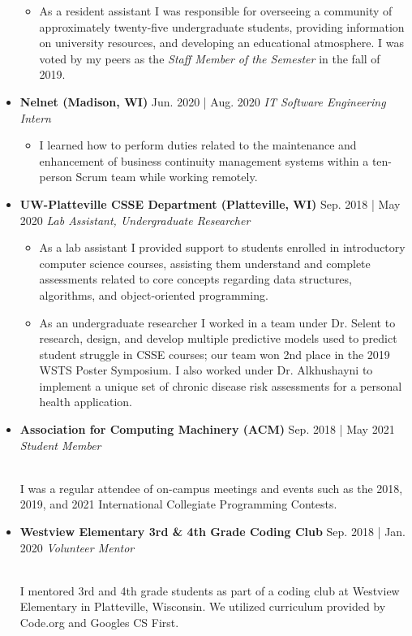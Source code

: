 \documentclass[11pt]{article}
\newlength{\outerbordwidth}
\newcommand{\resheading}[1]{
  \parbox{\textwidth}{\setlength{\FrameSep}{\outerbordwidth}
    \begin{shaded}
\setlength{\fboxsep}{0pt}\framebox[\textwidth][l]{\setlength{\fboxsep}{4pt}\fcolorbox{shadecolorB}{shadecolorB}{\textbf{\sffamily{\mbox{~}\makebox[6.762in][l]{\large #1} \vphantom{p\^{E}}}}}}
    \end{shaded}
  }\vspace{-11pt}
}
\newcommand{\job}[3]{\vspace{1.5mm}
  \textbf{#1} \hfill #2 \linebreak \textit{#3}
}
\newcommand{\organization}[3]{\vspace{1.5mm}
  \textbf{#1} \hfill #2 \linebreak \textit{#3}
}
\begin{document}
\begin{itemize}[leftmargin=*]
\begin{itemize}
	      	\item As a resident assistant I was responsible for overseeing a community of approximately twenty-five undergraduate students, providing information on university resources, and developing an educational atmosphere. I was voted by my peers as the \emph{Staff Member of the Semester} in the fall of 2019.
	      \end{itemize}
	\item[]
	      \job
	      {Nelnet (Madison, WI)}
	      {Jun. 2020 | Aug. 2020}
	      {IT Software Engineering Intern}
	      \begin{itemize}
	      	\item I learned how to perform duties related to the maintenance and enhancement of business continuity management systems within a ten-person Scrum team while working remotely.
	      \end{itemize}
	\item[]
	      \job
	      {UW-Platteville CSSE Department (Platteville, WI)}
	      {Sep. 2018 | May 2020}
	      {Lab Assistant, Undergraduate Researcher}
	      \begin{itemize}
		\item As a lab assistant I provided support to students enrolled in introductory computer science courses, assisting them understand and complete assessments related to core concepts regarding data structures, algorithms, and object-oriented programming.
	      	\item As an undergraduate researcher I worked in a team under Dr. Selent to research, design, and develop multiple predictive models used to predict student struggle in CSSE courses; our team won 2nd place in the 2019 WSTS Poster Symposium. I also worked under Dr. Alkhushayni to implement a unique set of chronic disease risk assessments for a personal health application.
	      \end{itemize}
\end{itemize}
\resheading{Organizations}
\begin{itemize}[leftmargin=*]
	\item[]
	      \organization
	      {Association for Computing Machinery (ACM)}
	      {Sep. 2018 | May 2021}
	      {Student Member}
	      {\\I was a regular attendee of on-campus meetings and events such as the 2018, 2019, and 2021 International Collegiate Programming Contests.}
	\item[]
	      \organization
	      {Westview Elementary 3rd \& 4th Grade Coding Club}
	      {Sep. 2018 | Jan. 2020}
	      {Volunteer Mentor}
	      {\\I mentored 3rd and 4th grade students as part of a coding club at Westview Elementary in Platteville, Wisconsin. We utilized curriculum provided by Code.org and Google\textquotesingle{}s CS First.}
\end{itemize}
\ 
\end{document}
